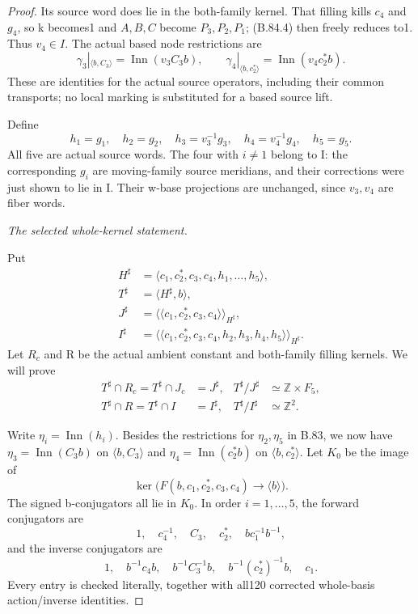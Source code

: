 \begin{proof}
Its source word does lie in the both-family kernel. That filling kills
\(c_4\) and \(g_4\), so k becomes1 and \(A,B,C\) become
\(P_3,P_2,P_1\); (B.84.4) then freely reduces to1. Thus \(v_4\in I\).
The actual based node restrictions are
\[
 \gamma_3|_{\langle b,C_3\rangle}
     =\operatorname{Inn}(v_3C_3b),\qquad
 \gamma_4|_{\langle b,c_2^*\rangle}
     =\operatorname{Inn}(v_4c_2^*b).
 \tag{B.84.5}
\]
These are identities for the actual source operators, including their
common transports; no local marking is substituted for a based source
lift.

Define
\[
 h_1=g_1,\quad h_2=g_2,\quad h_3=v_3^{-1}g_3,\quad
 h_4=v_4^{-1}g_4,\quad h_5=g_5.
 \tag{B.84.6}
\]
All five are actual source words. The four with \(i\ne1\) belong to I:
the corresponding \(g_i\) are moving-family source meridians, and
their corrections were just shown to lie in I. Their w-base projections
are unchanged, since \(v_3,v_4\) are fiber words.

\emph{The selected whole-kernel statement.}\par\nopagebreak
Put
\[
 \begin{split}
 H^\sharp&=\langle c_1,c_2^*,c_3,c_4,h_1,\ldots,h_5\rangle,
       \\
 T^\sharp&=\langle H^\sharp,b\rangle,\\
 J^\sharp&=\langle\!\langle c_1,c_2^*,c_3,c_4
                         \rangle\!\rangle_{H^\sharp},\\
 I^\sharp&=\langle\!\langle c_1,c_2^*,c_3,c_4,h_2,h_3,h_4,h_5
                         \rangle\!\rangle_{H^\sharp}.
 \end{split}
 \tag{B.84.7}
\]
Let \(R_c\) and R be the actual ambient constant and both-family
filling kernels. We will prove
\[
 \begin{aligned}
 T^\sharp\cap R_c=T^\sharp\cap J_c&=J^\sharp,
       &T^\sharp/J^\sharp&\simeq\mathbb Z\times F_5,\\
 T^\sharp\cap R=T^\sharp\cap I&=I^\sharp,
       &T^\sharp/I^\sharp&\simeq\mathbb Z^2.
 \end{aligned}
 \tag{B.84.8}
\]

Write \(\eta_i=\operatorname{Inn}(h_i)\). Besides the restrictions
for \(\eta_2,\eta_5\) in B.83, we now have
\(\eta_3=\operatorname{Inn}(C_3b)\) on \(\langle b,C_3\rangle\)
and \(\eta_4=\operatorname{Inn}(c_2^*b)\) on
\(\langle b,c_2^*\rangle\). Let \(K_0\) be the image of
\[
 \ker\bigl(F(b,c_1,c_2^*,c_3,c_4)\longrightarrow\langle b\rangle\bigr).
 \tag{B.84.9}
\]
The signed b-conjugators all lie in \(K_0\). In order \(i=1,\ldots,5\),
the forward conjugators are
\[
 1,\quad c_4^{-1},\quad C_3,\quad c_2^*,\quad bc_1^{-1}b^{-1},
\]
and the inverse conjugators are
\[
 1,\quad b^{-1}c_4b,\quad b^{-1}C_3^{-1}b,\quad
 b^{-1}(c_2^*)^{-1}b,\quad c_1.
 \tag{B.84.10}
\]
Every entry is checked literally, together with all120 corrected
whole-basis action/inverse identities.


\end{proof}
